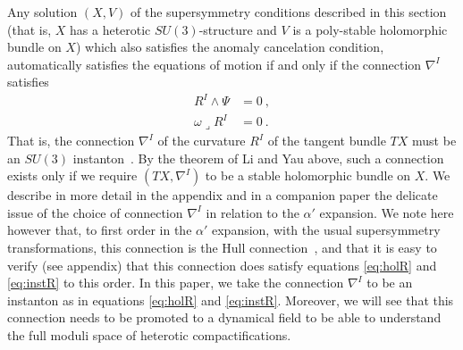 \documentclass[12pt,a4paper]{article}
\theoremstyle{definition}
\begin{document}

Any solution $(X,V)$ of the supersymmetry conditions described in this section (that is, $X$ has a heterotic $SU(3)$-structure and $V$ is a poly-stable holomorphic bundle on $X$) which also satisfies the anomaly cancelation condition, automatically satisfies  the equations of motion if and only if the connection $\nabla^I$ satisfies
\begin{align} 
R^I\wedge\Psi &= 0~,\label{eq:holR}\\
 \omega\lrcorner R^I &= 0~.\label{eq:instR}
 \end{align}
That is, the connection $\nabla^I$ of the curvature $R^I$ of the tangent bundle $TX$ must be an $SU(3)$ instanton~\citep{Hull:1986kz, Ivanov:2009rh, Martelli:2010jx, delaossa2014}.  By the theorem of Li and Yau above, such a connection exists only if we require $(TX, \nabla^I)$ to be a stable holomorphic bundle on $X$.   We describe in more detail in the appendix and in a companion paper \citep{delaossa2014} the delicate issue of the choice of connection $\nabla^I$ in relation to the $\alpha'$ expansion.  We note here however that, to first order in the $\alpha'$ expansion, with the usual supersymmetry transformations, this connection is the Hull connection~\citep{Hull:1986kz}, and that it is easy to verify (see appendix) that this connection does satisfy equations \eqref{eq:holR} and \eqref{eq:instR} to this order.   In this paper, we take the connection $\nabla^I$ to be an instanton as in equations \eqref{eq:holR} and \eqref{eq:instR}.  Moreover, we will see that this connection needs to be promoted to a dynamical field to be able to understand the full moduli space of heterotic compactifications.
\end{document}

